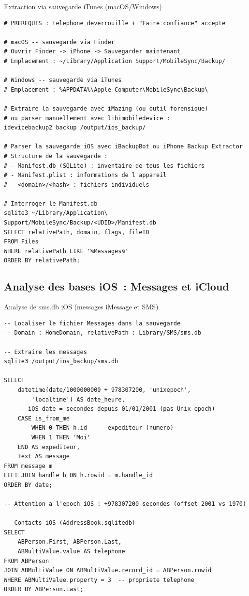 \begin{boxoutils}{Extraction via sauvegarde iTunes (macOS/Windows)}
\begin{lstlisting}[language=bash_forensique]
# PREREQUIS : telephone deverrouille + "Faire confiance" accepte

# macOS -- sauvegarde via Finder
# Ouvrir Finder -> iPhone -> Sauvegarder maintenant
# Emplacement : ~/Library/Application Support/MobileSync/Backup/

# Windows -- sauvegarde via iTunes
# Emplacement : %APPDATA%\Apple Computer\MobileSync\Backup\

# Extraire la sauvegarde avec iMazing (ou outil forensique)
# ou parser manuellement avec libimobiledevice :
idevicebackup2 backup /output/ios_backup/

# Parser la sauvegarde iOS avec iBackupBot ou iPhone Backup Extractor
# Structure de la sauvegarde :
# - Manifest.db (SQLite) : inventaire de tous les fichiers
# - Manifest.plist : informations de l'appareil
# - <domain>/<hash> : fichiers individuels

# Interroger le Manifest.db
sqlite3 ~/Library/Application\ Support/MobileSync/Backup/<UDID>/Manifest.db
SELECT relativePath, domain, flags, fileID
FROM Files
WHERE relativePath LIKE '%Messages%'
ORDER BY relativePath;
\end{lstlisting}
\end{boxoutils}

\subsection{Analyse des bases iOS~: Messages et iCloud}

\begin{boxoutils}{Analyse de sms.db iOS (messages iMessage et SMS)}
\begin{lstlisting}[language=bash_forensique]
-- Localiser le fichier Messages dans la sauvegarde
-- Domain : HomeDomain, relativePath : Library/SMS/sms.db

-- Extraire les messages
sqlite3 /output/ios_backup/sms.db

SELECT
    datetime(date/1000000000 + 978307200, 'unixepoch',
        'localtime') AS date_heure,
    -- iOS date = secondes depuis 01/01/2001 (pas Unix epoch)
    CASE is_from_me
        WHEN 0 THEN h.id   -- expediteur (numero)
        WHEN 1 THEN 'Moi'
    END AS expediteur,
    text AS message
FROM message m
LEFT JOIN handle h ON h.rowid = m.handle_id
ORDER BY date;

-- Attention a l'epoch iOS : +978307200 secondes (offset 2001 vs 1970)

-- Contacts iOS (AddressBook.sqlitedb)
SELECT
    ABPerson.First, ABPerson.Last,
    ABMultiValue.value AS telephone
FROM ABPerson
JOIN ABMultiValue ON ABMultiValue.record_id = ABPerson.rowid
WHERE ABMultiValue.property = 3  -- propriete telephone
ORDER BY ABPerson.Last;
\end{lstlisting}
\end{boxoutils}

